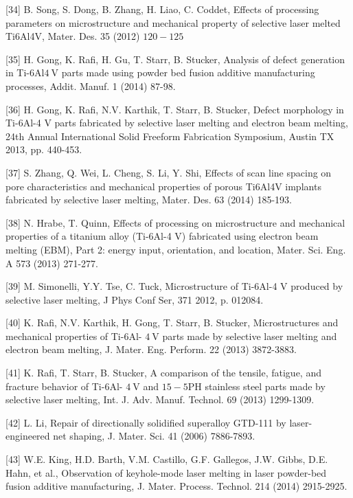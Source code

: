 \documentclass[10pt]{article}
\begin{document}
[34] B. Song, S. Dong, B. Zhang, H. Liao, C. Coddet, Effects of processing parameters on microstructure and mechanical property of selective laser melted Ti6Al4V, Mater. Des. 35 (2012) $120-125$

[35] H. Gong, K. Rafi, H. Gu, T. Starr, B. Stucker, Analysis of defect generation in Ti-6Al$4 \mathrm{~V}$ parts made using powder bed fusion additive manufacturing processes, Addit. Manuf. 1 (2014) 87-98.

[36] H. Gong, K. Rafi, N.V. Karthik, T. Starr, B. Stucker, Defect morphology in Ti-6Al-4 V parts fabricated by selective laser melting and electron beam melting, 24th Annual International Solid Freeform Fabrication Symposium, Austin TX 2013, pp. 440-453.

[37] S. Zhang, Q. Wei, L. Cheng, S. Li, Y. Shi, Effects of scan line spacing on pore characteristics and mechanical properties of porous Ti6Al4V implants fabricated by selective laser melting, Mater. Des. 63 (2014) 185-193.

[38] N. Hrabe, T. Quinn, Effects of processing on microstructure and mechanical properties of a titanium alloy (Ti-6Al-4 V) fabricated using electron beam melting (EBM), Part 2: energy input, orientation, and location, Mater. Sci. Eng. A 573 (2013) 271-277.

[39] M. Simonelli, Y.Y. Tse, C. Tuck, Microstructure of Ti-6Al-4 V produced by selective laser melting, J Phys Conf Ser, 371 2012, p. 012084.

[40] K. Rafi, N.V. Karthik, H. Gong, T. Starr, B. Stucker, Microstructures and mechanical properties of Ti-6Al- $4 \mathrm{~V}$ parts made by selective laser melting and electron beam melting, J. Mater. Eng. Perform. 22 (2013) 3872-3883.

[41] K. Rafi, T. Starr, B. Stucker, A comparison of the tensile, fatigue, and fracture behavior of Ti-6Al- $4 \mathrm{~V}$ and $15-5 \mathrm{PH}$ stainless steel parts made by selective laser melting, Int. J. Adv. Manuf. Technol. 69 (2013) 1299-1309.

[42] L. Li, Repair of directionally solidified superalloy GTD-111 by laser-engineered net shaping, J. Mater. Sci. 41 (2006) 7886-7893.

[43] W.E. King, H.D. Barth, V.M. Castillo, G.F. Gallegos, J.W. Gibbs, D.E. Hahn, et al., Observation of keyhole-mode laser melting in laser powder-bed fusion additive manufacturing, J. Mater. Process. Technol. 214 (2014) 2915-2925.
\end{document}
